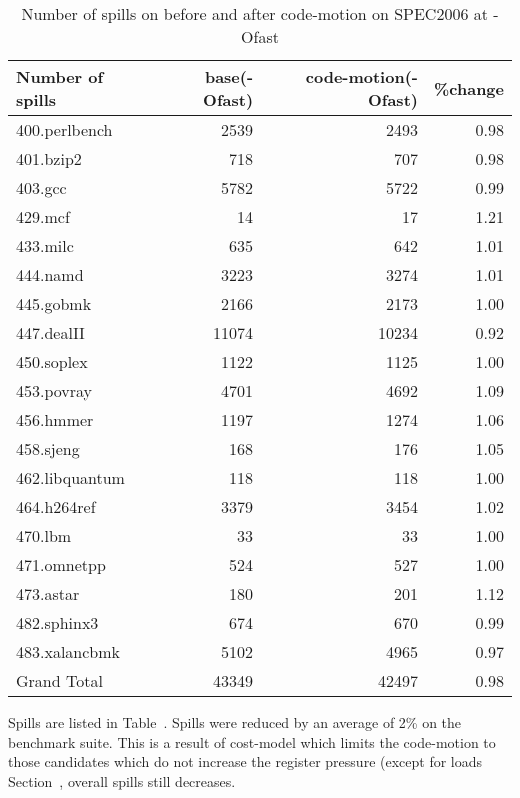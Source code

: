 \documentclass[acmlarge,review,anonymous]{acmart}\settopmatter{printfolios=true}
\begin{document}
\begin{table}[h!]
  \begin{center}
    \begin{tabular}{|l|r|r|r|}
      \hline
Number of spills  &base(-Ofast) &code-motion(-Ofast) &\%change \\\hline
400.perlbench	  & 2539	& 2493	& 0.98 \\\hline
401.bzip2	  & 718	        & 707	& 0.98 \\\hline
403.gcc	          & 5782	& 5722	& 0.99 \\\hline
429.mcf	          & 14	        & 17	& 1.21 \\\hline
433.milc	  & 635	        & 642	& 1.01 \\\hline
444.namd	  & 3223	& 3274	& 1.01 \\\hline
445.gobmk	  & 2166	& 2173	& 1.00 \\\hline
447.dealII	  & 11074	& 10234	& 0.92 \\\hline
450.soplex	  & 1122	& 1125	& 1.00 \\\hline
453.povray	  & 4701	& 4692	& 1.09 \\\hline
456.hmmer	  & 1197	& 1274	& 1.06 \\\hline
458.sjeng	  & 168	        & 176	& 1.05 \\\hline
462.libquantum	  & 118	        & 118	& 1.00 \\\hline
464.h264ref	  & 3379	& 3454	& 1.02 \\\hline
470.lbm	          & 33	        & 33	& 1.00 \\\hline
471.omnetpp	  & 524	        & 527	& 1.00 \\\hline
473.astar	  & 180	        & 201	& 1.12 \\\hline
482.sphinx3	  & 674	        & 670	& 0.99 \\\hline
483.xalancbmk	  & 5102	& 4965	& 0.97 \\\hline
Grand Total	  & 43349	& 42497	& 0.98 \\\hline
    \end{tabular}
  \end{center}
  \caption{Number of spills on before and after code-motion on SPEC2006 at -Ofast}
  \label{tab:spills}
\end{table}

Spills are listed in Table~\cite{tab:spills}. Spills were reduced by an average of 2\% on the
\SPEC{} benchmark suite. This is a result of cost-model which limits the code-motion to those
candidates which do not increase the register pressure (except for loads Section~\cite{sec:cost-models},
overall spills still decreases.
\end{document}
